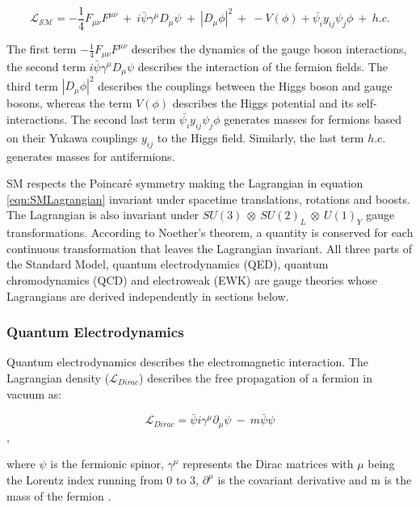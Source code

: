 \begin{equation}
\mathcal{L_{SM}} = -\frac{1}{4}F_{\mu\nu}F^{\mu\nu} ~+~ i\bar{\psi}\gamma^{\mu}D_{\mu}\psi ~+~ |D_{\mu}\phi|^{2} ~+~ -V(\phi) + \bar{\psi_{i}}y_{ij}\psi_{j}\phi ~+~ h.c.
\label{eqn:SMLagrangian}
\end{equation}

The first term $-\frac{1}{4}F_{\mu\nu}F^{\mu\nu}$ describes the dynamics of the gauge boson interactions, the second term $i\bar{\psi}\gamma^{\mu}D_{\mu}\psi$ describes the interaction of the fermion fields. The third term $|D_{\mu}\phi|^{2}$ describes the couplings between the Higgs boson and gauge bosons, whereas the term $V(\phi)$ describes the Higgs potential and its self-interactions. The second last term $\bar{\psi_{i}}y_{ij}\psi_{j}\phi$ generates masses for fermions based on their Yukawa couplings $y_{ij}$ to the Higgs field. Similarly, the last term $h.c.$ generates masses for antifermions. 

SM respects the Poincar\'e symmetry making the Lagrangian in equation \ref{eqn:SMLagrangian} invariant under spacetime translations, rotations and boosts. The Lagrangian is also invariant under $SU(3)~\otimes~SU(2)_{L}~\otimes~U(1)_{Y}$ gauge transformations. According to Noether's theorem, a quantity is conserved for each continuous transformation that leaves the Lagrangian invariant. All three parts of the Standard Model, quantum electrodynamics (QED), quantum chromodynamics (QCD) and electroweak (EWK) are gauge theories whose Lagrangians are derived independently in sections below.

\subsubsection{Quantum Electrodynamics}
\label{subsubsec:QED}
Quantum electrodynamics describes the electromagnetic interaction. The Lagrangian density ($\mathcal{L}_{Dirac}$) describes the free propagation of a fermion in vacuum as:  

\begin{equation}
\mathcal{L}_{Dirac} = \bar{\psi} i \gamma^{\mu} \partial_{\mu} \psi ~-~ m\bar{\psi}\psi
\label{eqn:DiracLag}
\end{equation},

where $\psi$ is the fermionic spinor, $\gamma^{\mu}$ represents the Dirac matrices with $\mu$ being the Lorentz index running from $0$ to $3$, $\partial^{\mu}$ is the covariant derivative and m is the mass of the fermion \cite{}. 

